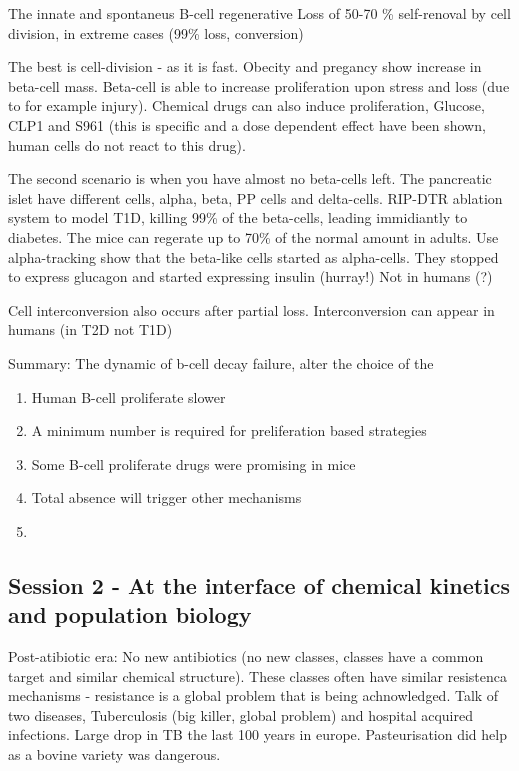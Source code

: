 \documentclass[12p]{article}
\begin{document}
The innate and spontaneus B-cell regenerative
Loss of 50-70 \% self-renoval by cell division, in extreme cases (99\% loss, conversion)

The best is cell-division - as it is fast.
Obecity and pregancy show increase in beta-cell mass.
Beta-cell is able to increase proliferation upon stress and loss (due to for example injury).
Chemical drugs can also induce proliferation, Glucose, CLP1 and S961 (this is specific and a dose dependent effect have been shown, human cells do not react to this drug).

The second scenario is when you have almost no beta-cells left.
The pancreatic islet have different cells, alpha, beta, PP cells and delta-cells.
RIP-DTR ablation system to model T1D, killing 99\% of the beta-cells, leading immidiantly to diabetes. 
The mice can regerate up to 70\% of the normal amount in adults.
Use alpha-tracking show that the beta-like cells started as alpha-cells. 
They stopped to express glucagon and started expressing insulin (hurray!)
Not in humans (?)

Cell interconversion also occurs after partial loss.
Interconversion can appear in humans (in T2D not T1D)

Summary: The dynamic of b-cell decay failure, alter the choice of the 

\begin{enumerate}
    \item
	Human B-cell proliferate slower
    \item
	A minimum number is required for preliferation based strategies
    \item
	Some B-cell proliferate drugs were promising in mice 
    \item
	Total absence will trigger other mechanisms
    \item
\end{enumerate}


\subsection*{Session 2 - At the interface of chemical kinetics and population biology}

Post-atibiotic era: No new antibiotics (no new classes, classes have a common target and similar chemical structure).
These classes often have similar resistenca mechanisms - resistance is a global problem that is being achnowledged.
Talk of two diseases, Tuberculosis (big killer, global problem) and hospital acquired infections.
Large drop in TB the last 100 years in europe.
Pasteurisation did help as a bovine variety was dangerous.
\end{document}
